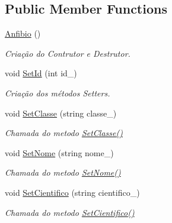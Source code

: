 \subsection*{Public Member Functions}
\begin{DoxyCompactItemize}
\item 
\mbox{\hyperlink{class_anfibio_a91fd9b91b9124ab41ea9e9c9bb013476}{Anfibio}} ()
\begin{DoxyCompactList}\small\item\em Criação do Contrutor e Destrutor. \end{DoxyCompactList}\item 
void \mbox{\hyperlink{class_anfibio_a2efef746a06025c1b75c29c62f23909d}{Set\+Id}} (int id\+\_\+)
\begin{DoxyCompactList}\small\item\em Criação dos métodos Setters. \end{DoxyCompactList}\item 
\mbox{\label{class_anfibio_af33d573093b0c426b92f94fce9fffed8}} 
void \mbox{\hyperlink{class_anfibio_af33d573093b0c426b92f94fce9fffed8}{Set\+Classe}} (string classe\+\_\+)
\begin{DoxyCompactList}\small\item\em Chamada do metodo \mbox{\hyperlink{class_anfibio_af33d573093b0c426b92f94fce9fffed8}{Set\+Classe()}} \end{DoxyCompactList}\item 
\mbox{\label{class_anfibio_a04a14e96798b0e7372c523851649b3bf}} 
void \mbox{\hyperlink{class_anfibio_a04a14e96798b0e7372c523851649b3bf}{Set\+Nome}} (string nome\+\_\+)
\begin{DoxyCompactList}\small\item\em Chamada do metodo \mbox{\hyperlink{class_anfibio_a04a14e96798b0e7372c523851649b3bf}{Set\+Nome()}} \end{DoxyCompactList}\item 
\mbox{\label{class_anfibio_a00eeb256834dbcd4601b2e82a5a22d5c}} 
void \mbox{\hyperlink{class_anfibio_a00eeb256834dbcd4601b2e82a5a22d5c}{Set\+Cientifico}} (string cientifico\+\_\+)
\begin{DoxyCompactList}\small\item\em Chamada do metodo \mbox{\hyperlink{class_anfibio_a00eeb256834dbcd4601b2e82a5a22d5c}{Set\+Cientifico()}} \end{DoxyCompactList}\item 

\end{DoxyCompactItemize}
